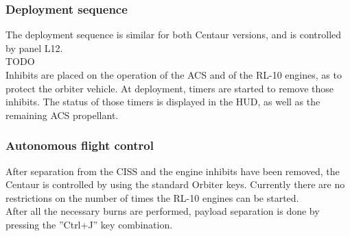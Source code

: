 \documentclass[Space_Shuttle_Ultra_Manual.tex]{subfiles}
\begin{document}
\begin{multicols*}{2}
\subsubsection{Deployment sequence}
The deployment sequence is similar for both Centaur versions, and is controlled by panel L12.
\\
TODO
\\
Inhibits are placed on the operation of the ACS and of the RL-10 engines, as to protect the orbiter vehicle. At deployment, timers are started to remove those inhibits. The status of those timers is displayed in the HUD, as well as the remaining ACS propellant.

\subsubsection{Autonomous flight control}
After separation from the CISS and the engine inhibits have been removed, the Centaur is controlled by using the standard Orbiter keys. Currently there are no restrictions on the number of times the RL-10 engines can be started.
\\
After all the necessary burns are performed, payload separation is done by pressing the ''Ctrl+J'' key combination.

\end{multicols*}

\newpage
\end{document}
